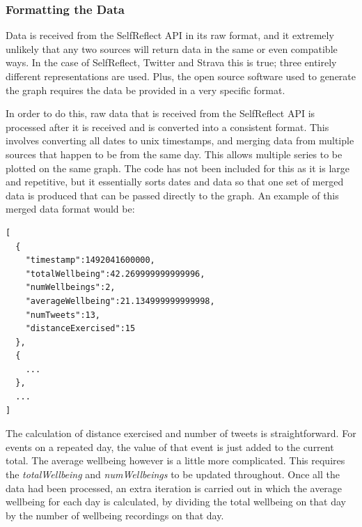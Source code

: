 \documentclass[11pt,openright,a4paper]{report}
\begin{document}
\subsubsection{Formatting the Data}
Data is received from the SelfReflect API in its raw format, and it extremely unlikely that any two sources will return data in the same or even compatible ways. In the case of SelfReflect, Twitter and Strava this is true; three entirely different representations are used. Plus, the open source software used to generate the graph requires the data be provided in a very specific format.

In order to do this, raw data that is received from the SelfReflect API is processed after it is received and is converted into a consistent format. This involves converting all dates to unix timestamps, and merging data from multiple sources that happen to be from the same day. This allows multiple series to be plotted on the same graph. The code has not been included for this as it is large and repetitive, but it essentially sorts dates and data so that one set of merged data is produced that can be passed directly to the graph. An example of this merged data format would be:
\begin{lstlisting}
[
  {
    "timestamp":1492041600000,
    "totalWellbeing":42.269999999999996,
    "numWellbeings":2,
    "averageWellbeing":21.134999999999998,
    "numTweets":13,
    "distanceExercised":15
  },
  {
    ...
  },
  ...
]
\end{lstlisting}
The calculation of distance exercised and number of tweets is straightforward. For events on a repeated day, the value of that event is just added to the current total. The average wellbeing however is a little more complicated. This requires the \emph{totalWellbeing} and \emph{numWellbeings} to be updated throughout. Once all the data had been processed, an extra iteration is carried out in which the average wellbeing for each day is calculated, by dividing the total wellbeing on that day by the number of wellbeing recordings on that day.
\end{document}
